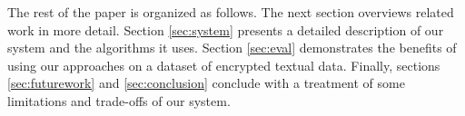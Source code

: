 The rest of the paper is organized as follows. The next section overviews
related work in more detail.
Section \ref{sec:system} presents a detailed description of our system and the 
algorithms it uses.
Section \ref{sec:eval} demonstrates the benefits of using our approaches
on a dataset of encrypted textual data. Finally, sections \ref{sec:futurework} and 
\ref{sec:conclusion} conclude with a treatment of some limitations and trade-offs of our system.
